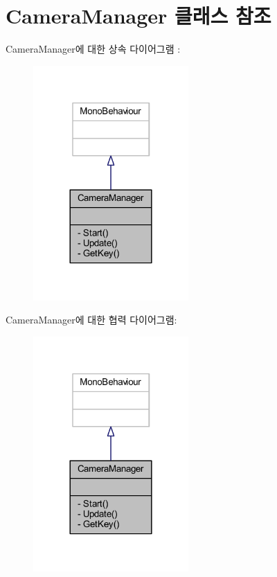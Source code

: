 \hypertarget{class_camera_manager}{}\section{Camera\+Manager 클래스 참조}
\label{class_camera_manager}


Camera\+Manager에 대한 상속 다이어그램 \+: 
\nopagebreak
\begin{figure}[H]
\begin{center}
\leavevmode
\includegraphics[width=168pt]{d7/d54/class_camera_manager__inherit__graph}
\end{center}
\end{figure}


Camera\+Manager에 대한 협력 다이어그램\+:
\nopagebreak
\begin{figure}[H]
\begin{center}
\leavevmode
\includegraphics[width=168pt]{d0/da3/class_camera_manager__coll__graph}
\end{center}
\end{figure}

